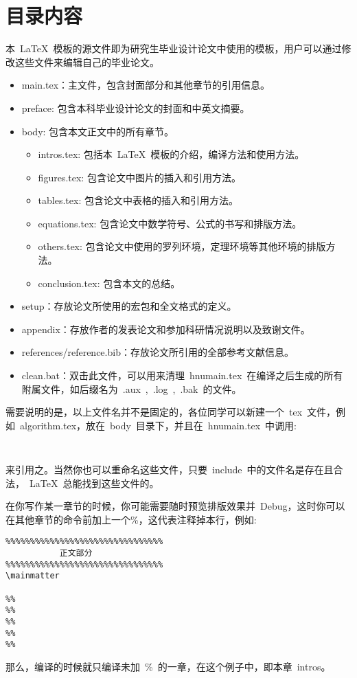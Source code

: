 \section{目录内容}
本~\LaTeX{}~模板的源文件即为研究生毕业设计论文中使用的模板，用户可以通过修改这些文件来编辑自己的毕业论文。
\begin{itemize}
\item{main.tex}：主文件，包含封面部分和其他章节的引用信息。
\item{preface}: 包含本科毕业设计论文的封面和中英文摘要。
\item{body}: 包含本文正文中的所有章节。
\begin{itemize}
\item{intros.tex}: 包括本~\LaTeX{}~模板的介绍，编译方法和使用方法。
\item{figures.tex}: 包含论文中图片的插入和引用方法。
\item{tables.tex}: 包含论文中表格的插入和引用方法。
\item{equations.tex}: 包含论文中数学符号、公式的书写和排版方法。
\item{others.tex}: 包含论文中使用的罗列环境，定理环境等其他环境的排版方法。
\item{conclusion.tex}: 包含本文的总结。
\end{itemize}
\item{setup}：存放论文所使用的宏包和全文格式的定义。
\item{appendix}：存放作者的发表论文和参加科研情况说明以及致谢文件。
\item{references/reference.bib}：存放论文所引用的全部参考文献信息。
\item{clean.bat}：双击此文件，可以用来清理~hnumain.tex~在编译之后生成的所有附属文件，如后缀名为~.aux~,~.log~,~.bak~的文件。
\end{itemize}

需要说明的是，以上文件名并不是固定的，各位同学可以新建一个~tex~文件，例如~algorithm.tex，放在~body~目录下，并且在~hnumain.tex~中调用:
\begin{verbatim}
    
\end{verbatim}
来引用之。当然你也可以重命名这些文件，只要~include~中的文件名是存在且合法，~\LaTeX~总能找到这些文件的。

在你写作某一章节的时候，你可能需要随时预览排版效果并~Debug，这时你可以在其他章节的\verb||命令前加上一个\%，这代表注释掉本行，例如:
\begin{verbatim}
%%%%%%%%%%%%%%%%%%%%%%%%%%%%%%%%
           正文部分
%%%%%%%%%%%%%%%%%%%%%%%%%%%%%%%%
\mainmatter

%%
%%
%%
%%
%%
\end{verbatim}
那么，编译的时候就只编译未加~\%~的一章，在这个例子中，即本章~intros。

